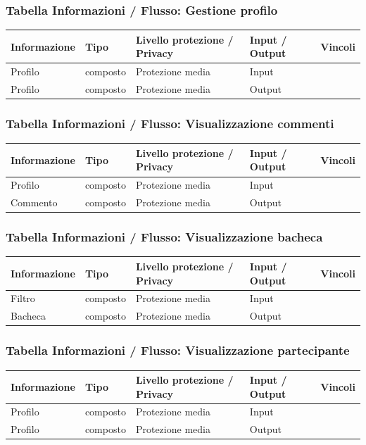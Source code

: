 \documentclass[12pt,a4paper]{report}
\begin{document}
\subsubsection{Tabella Informazioni / Flusso: Gestione profilo}
\begin{tabularx}{\textwidth}{|X|X|X|X|X|}
    \hline
    \rowcolor{studyColor} \textbf{Informazione} & \textbf{Tipo} & \textbf{Livello protezione / Privacy} & \textbf{Input / Output} & \textbf{Vincoli} \\ \hline
    \endhead
    Profilo & composto & Protezione media & Input & \\ \hline
    Profilo & composto & Protezione media & Output & \\ \hline
\end{tabularx}

\subsubsection{Tabella Informazioni / Flusso: Visualizzazione commenti}
\begin{tabularx}{\textwidth}{|X|X|X|X|X|}
    \hline
    \rowcolor{studyColor} \textbf{Informazione} & \textbf{Tipo} & \textbf{Livello protezione / Privacy} & \textbf{Input / Output} & \textbf{Vincoli} \\ \hline
    \endhead
    Profilo & composto & Protezione media & Input & \\ \hline
    Commento & composto & Protezione media & Output & \\ \hline
\end{tabularx}

\subsubsection{Tabella Informazioni / Flusso: Visualizzazione bacheca}
\begin{tabularx}{\textwidth}{|X|X|X|X|X|}
    \hline
    \rowcolor{studyColor} \textbf{Informazione} & \textbf{Tipo} & \textbf{Livello protezione / Privacy} & \textbf{Input / Output} & \textbf{Vincoli} \\ \hline
    \endhead
    Filtro & composto & Protezione media & Input & \\ \hline
    Bacheca & composto & Protezione media & Output & \\ \hline
\end{tabularx}

\subsubsection{Tabella Informazioni / Flusso: Visualizzazione partecipante}
\begin{tabularx}{\textwidth}{|X|X|X|X|X|}
    \hline
    \rowcolor{studyColor} \textbf{Informazione} & \textbf{Tipo} & \textbf{Livello protezione / Privacy} & \textbf{Input / Output} & \textbf{Vincoli} \\ \hline
    \endhead
    Profilo & composto & Protezione media & Input & \\ \hline
    Profilo & composto & Protezione media & Output & \\ \hline
\end{tabularx}
\end{document}
